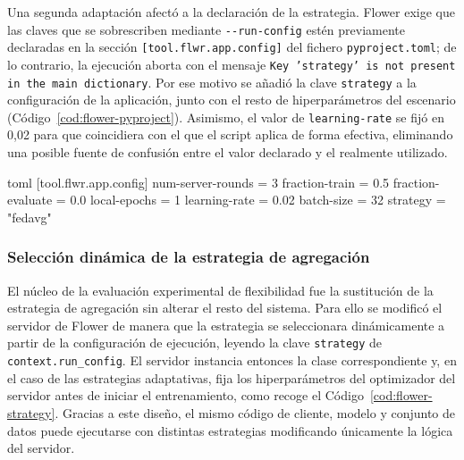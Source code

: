 Una segunda adaptación afectó a la declaración de la estrategia. Flower exige que
las claves que se sobrescriben mediante \texttt{-{}-run-config} estén previamente
declaradas en la sección \texttt{[tool.flwr.app.config]} del fichero
\texttt{pyproject.toml}; de lo contrario, la ejecución aborta con el mensaje
\texttt{Key 'strategy' is not present in the main dictionary}. Por ese
motivo se añadió la clave \texttt{strategy} a la configuración de la aplicación,
junto con el resto de hiperparámetros del escenario (Código~\ref{cod:flower-pyproject}).
Asimismo, el valor de \texttt{learning-rate} se fijó en 0,02 para que coincidiera
con el que el script aplica de forma efectiva, eliminando una posible fuente de
confusión entre el valor declarado y el realmente utilizado.

\begin{codigo}[title={pyproject.toml}, label={cod:flower-pyproject}, list entry={\protect\numberline{\thelisting}Configuración de la aplicación en Flower (pyproject.toml)}]{toml}
[tool.flwr.app.config]
num-server-rounds = 3
fraction-train = 0.5
fraction-evaluate = 0.0
local-epochs = 1
learning-rate = 0.02
batch-size = 32
strategy = "fedavg"
\end{codigo}

\subsubsection{Selección dinámica de la estrategia de agregación}\label{subsec:flex-flower-strategy}

El núcleo de la evaluación experimental de flexibilidad fue la sustitución de la
estrategia de agregación sin alterar el resto del sistema. Para ello se modificó
el servidor de Flower de manera que la estrategia se seleccionara dinámicamente a
partir de la configuración de ejecución, leyendo la clave \texttt{strategy} de
\texttt{context.run_config}. El servidor instancia entonces la clase
correspondiente y, en el caso de las estrategias adaptativas, fija los
hiperparámetros del optimizador del servidor antes de iniciar el entrenamiento,
como recoge el Código~\ref{cod:flower-strategy}. Gracias a este diseño, el mismo
código de cliente, modelo y conjunto de datos puede ejecutarse con distintas
estrategias modificando únicamente la lógica del servidor.

